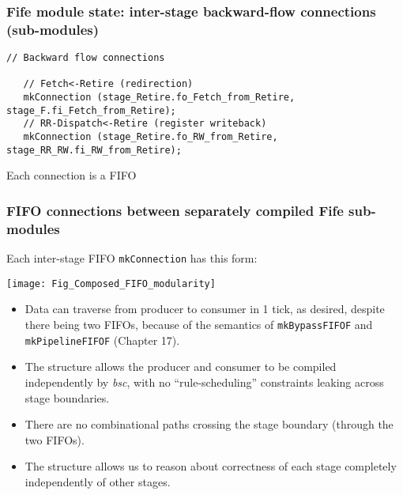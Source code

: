 
\begin{frame}[fragile]
\frametitle{Fife module state: inter-stage backward-flow connections (sub-modules)}

\footnotesize

\begin{minipage}{0.75\textwidth}\scriptsize
\begin{Verbatim}[frame=single, label=From src\_Fife/CPU.bsv]
   // Backward flow connections

   // Fetch<-Retire (redirection)
   mkConnection (stage_Retire.fo_Fetch_from_Retire, stage_F.fi_Fetch_from_Retire);
   // RR-Dispatch<-Retire (register writeback)
   mkConnection (stage_Retire.fo_RW_from_Retire, stage_RR_RW.fi_RW_from_Retire);
\end{Verbatim}
\end{minipage}
\hm
\begin{minipage}{0.22\textwidth}
Each connection is a FIFO
\end{minipage}

\end{frame}


\begin{frame}[fragile]
\frametitle{FIFO connections between separately compiled Fife sub-modules}

\footnotesize

\begin{minipage}{0.22\textwidth}
Each inter-stage FIFO {\tt mkConnection} has this form:
\end{minipage}
\hfill
\begin{minipage}{0.75\textwidth}
\texttt{[image: Fig\_Composed\_FIFO\_modularity]}
\end{minipage}

\PAUSE{\vspace{2ex}}

\begin{itemize}

 \item Data can traverse from producer to consumer in 1 tick, as
       desired, despite there being two FIFOs, because of the
       semantics of {\tt mkBypassFIFOF} and {\tt mkPipelineFIFOF}
       (Chapter 17).

 \item The structure allows the producer and consumer to be compiled
       independently by \emph{bsc}, with no ``rule-scheduling''
       constraints leaking across stage boundaries.

 \item There are no combinational paths crossing the stage boundary
       (through the two FIFOs).

 \item The structure allows us to reason about correctness of each
       stage completely independently of other stages.

\end{itemize}

\end{frame}

